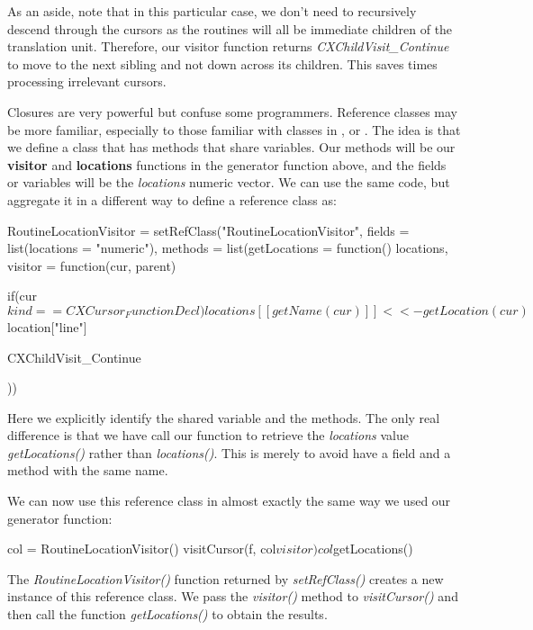 \documentclass[article]{jss}
\def\Cpp{\proglang{C$++$}}
\def\Java{\proglang{Java}}
\def\Python{\proglang{Python}}
\def\R{\proglang{R}}
\def\Rfunc#1{\textsl{#1()}}
\def\Rvar#1{\textsl{#1}}
\def\Rel#1{\textbf{#1}}
\begin{document}
As an aside, note that in this particular case, we don't need to
recursively descend through the cursors as the routines will all be
immediate children of the translation unit.  Therefore, our visitor
function returns \Rvar{CXChildVisit_Continue} to move to the next
sibling and not down across its children.  This saves times processing
irrelevant cursors.

Closures are very powerful but confuse some \R{} programmers.
Reference classes may be more familiar, especially to those familiar
with classes in \Cpp, \Java{} or \Python.  The idea is that we define
a class that has methods that share variables.  Our methods will be
our \Rel{visitor} and \Rel{locations} functions in the generator
function above, and the fields or variables will be the
\Rvar{locations} numeric vector.  We can use the same code, but
aggregate it in a different way to define a reference class as:
\begin{RCode}
RoutineLocationVisitor =
setRefClass("RoutineLocationVisitor",
    fields = list(locations = "numeric"),
    methods = list(getLocations = function() 
                                     locations,
                   visitor = 
                       function(cur, parent) {
                         if(cur$kind == CXCursor_FunctionDecl) 
                            locations[[ getName(cur) ]] <<- 
                                   getLocation(cur)$location["line"]
                               
                         CXChildVisit_Continue
                       }))
\end{RCode}
Here we explicitly identify the shared variable and the methods.  The
only real difference is that we have call our function to retrieve the
\Rvar{locations} value \Rfunc{getLocations} rather than
\Rfunc{locations}.  This is merely to avoid have a field and a method
with the same name.

We can now use this reference class in almost exactly the same way we
used our  generator function:
\begin{RCode}
col = RoutineLocationVisitor()
visitCursor(f, col$visitor)
col$getLocations()
\end{RCode}
The \Rfunc{RoutineLocationVisitor} function returned by
\Rfunc{setRefClass} creates a new instance of this reference class.
We pass the \Rfunc{visitor} method to \Rfunc{visitCursor} and then
call the function \Rfunc{getLocations} to obtain the results.
\end{document}
